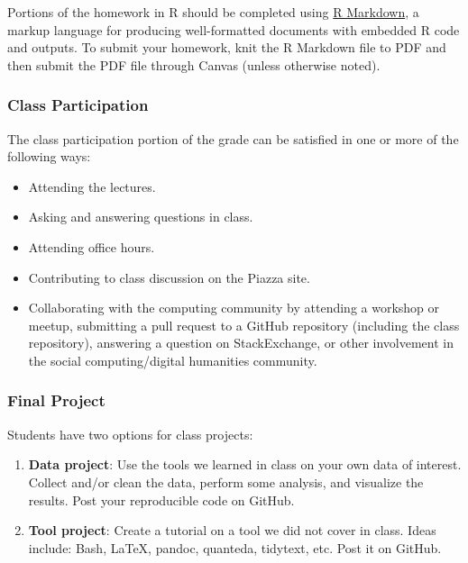 \documentclass[
]{book}
\providecommand{\tightlist}{%
  \setlength{\itemsep}{0pt}\setlength{\parskip}{0pt}}
\begin{document}
Portions of the homework in R should be completed using \href{https://rmarkdown.rstudio.com/}{R Markdown}, a markup language for producing well-formatted documents with embedded R code and outputs. To submit your homework, knit the R Markdown file to PDF and then submit the PDF file through Canvas (unless otherwise noted).

\hypertarget{class-participation}{%
\subsubsection*{Class Participation}\label{class-participation}}

The class participation portion of the grade can be satisfied in one or more of the following ways:

\begin{itemize}
\tightlist
\item
  Attending the lectures.
\item
  Asking and answering questions in class.
\item
  Attending office hours.
\item
  Contributing to class discussion on the Piazza site.
\item
  Collaborating with the computing community by attending a workshop or meetup, submitting a pull request to a GitHub repository (including the class repository), answering a question on StackExchange, or other involvement in the social computing/digital humanities community.
\end{itemize}

\hypertarget{final-project}{%
\subsubsection*{Final Project}\label{final-project}}

Students have two options for class projects:

\begin{enumerate}
\def\labelenumi{\arabic{enumi}.}
\item
  \textbf{Data project}: Use the tools we learned in class on your own data of interest. Collect and/or clean the data, perform some analysis, and visualize the results. Post your reproducible code on GitHub.
\item
  \textbf{Tool project}: Create a tutorial on a tool we did not cover in class. Ideas include: Bash, LaTeX, pandoc, quanteda, tidytext, etc. Post it on GitHub.
\end{enumerate}
\end{document}
